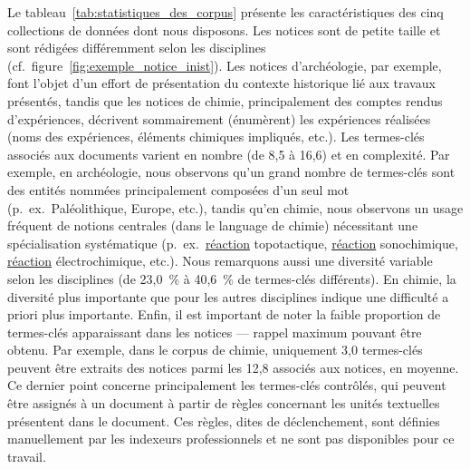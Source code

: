   Le tableau~\ref{tab:statistiques_des_corpus} présente les caractéristiques des
  cinq collections de données dont nous disposons. Les notices sont de petite
  taille et sont rédigées différemment selon les disciplines
  (cf.~figure~\ref{fig:exemple_notice_inist}). Les notices d'archéologie, par
  exemple, font l'objet d'un effort de présentation du contexte historique lié
  aux travaux présentés, tandis que les notices de chimie, principalement des
  comptes rendus d'expériences, décrivent sommairement (énumèrent) les
  expériences réalisées (noms des expériences, éléments chimiques impliqués,
  etc.). Les termes-clés associés aux documents varient en nombre (de 8,5 à
  16,6) et en complexité. Par exemple, en archéologie, nous observons qu'un
  grand nombre de termes-clés sont des entités nommées principalement composées
  d'un seul mot (p.~ex.~\og{}Paléolithique\fg{}, \og{}Europe\fg{}, etc.), tandis
  qu'en chimie, nous observons un usage fréquent de notions centrales (dans le
  language de chimie) nécessitant une spécialisation systématique
  (p.~ex.~\og{}\underline{réaction} topotactique\fg{}, \og{}\underline{réaction}
  sonochimique\fg{}, \og{}\underline{réaction} électrochimique\fg{}, etc.).
  Nous remarquons aussi une diversité variable selon les disciplines (de 23,0~\%
  à 40,6~\% de termes-clés différents). En chimie, la diversité plus importante
  que pour les autres disciplines indique une difficulté a priori plus
  importante. Enfin, il est important de noter la faible proportion de
  termes-clés apparaissant dans les notices --- rappel maximum pouvant être
  obtenu. Par exemple, dans le corpus de chimie, uniquement 3,0 termes-clés
  peuvent être extraits des notices parmi les 12,8 associés aux notices, en
  moyenne. Ce dernier point concerne principalement les termes-clés contrôlés,
  qui peuvent être assignés à un document à partir de règles concernant les
  unités textuelles présentent dans le document. Ces règles, dites de
  déclenchement, sont définies manuellement par les indexeurs professionnels et
  ne sont pas disponibles pour ce travail.
